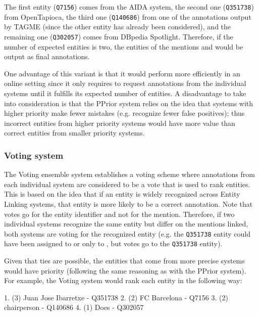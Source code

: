 The first entity (\texttt{Q7156}) comes from the AIDA system, the second one (\texttt{Q351738}) 
from OpenTapioca, the third one (\texttt{Q140686}) from one of the annotations output by 
TAGME (since the other entity has already been considered), and the remaining one (\texttt{Q302057}) 
comes from DBpedia Spotlight. Therefore, if the number of expected entities is two, the 
entities of the mentions  and  would be 
output as final annotations.

One advantage of this variant is that it would perform more efficiently in an online setting 
since it only requires to request annotations from the individual systems until it fulfills 
its expected number of entities. A disadvantage to take into consideration is that the PPrior 
system relies on the idea that systems with higher priority make fewer mistakes (e.g. 
recognize fewer false positives); thus incorrect entities from higher priority systems would 
have more value than correct entities from smaller priority systems.

\subsubsection{Voting system}
\label{cap3:system/entLinModule/ensembleSystems/voting}
The Voting ensemble system establishes a voting scheme where annotations from each individual 
system are considered to be a vote that is used to rank entities. This is based on the idea 
that if an entity is widely recognized across Entity Linking systems, that entity is more 
likely to be a correct annotation. Note that votes go for the entity identifier and not for 
the mention. Therefore, if two individual systems recognize the same entity but differ on the 
mentions linked, both systems are voting for the recognized entity (e.g. the \texttt{Q351738} 
entity could have been assigned to  or only to , 
but votes go to the \texttt{Q351738} entity).

Given that ties are possible, the entities that come from more precise systems would have priority 
(following the same reasoning as with the PPrior system). For example, the Voting system 
would rank each entity in the following way:

\begin{sparqlcode}[]
1. (3) Juan Jose Ibarretxe - Q351738
2. (2) FC Barcelona - Q7156
3. (2) chairperson - Q140686
4. (1) Does - Q302057
\end{sparqlcode}

